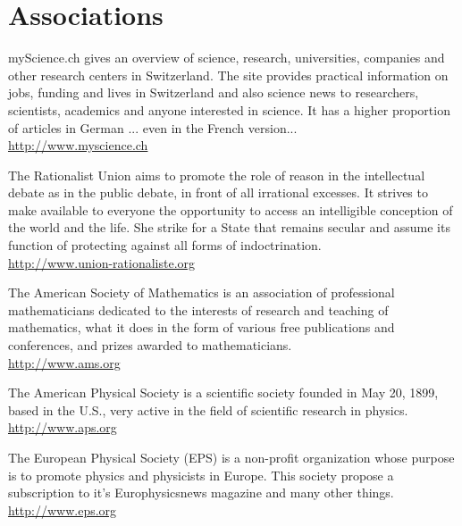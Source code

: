 	\section{Associations}

		{\Large {}} myScience.ch gives an overview of science, research, universities, companies and other research centers in Switzerland. The site provides practical information on jobs, funding and lives in Switzerland and also science news to researchers, scientists, academics and anyone interested in science. It has a higher proportion of articles in German ... even in the French version...\\
		\href{http://www.myscience.ch}{\color{blue}http://www.myscience.ch}
		
		{\Large {}}{\Large {}}{\Large {}}\bcdfrance{} The Rationalist Union aims to promote the role of reason in the intellectual debate as in the public debate, in front of all irrational excesses. It strives to make available to everyone the opportunity to access an intelligible conception of the world and the life. She strike for a State that remains secular and assume its function of protecting against all forms of indoctrination.\\
		\href{http://www.union-rationaliste.org}{\color{blue}http://www.union-rationaliste.org}
		
		{\Large {}}{\Large {}} The American Society of Mathematics is an association of professional mathematicians dedicated to the interests of research and teaching of mathematics, what it does in the form of various free publications and conferences, and prizes awarded to mathematicians.\\
		\href{http://www.ams.org}{\color{blue}http://www.ams.org}
		
		{\Large {}}{\Large {}} The American Physical Society is a scientific society founded in May 20, 1899, based in the U.S., very active in the field of scientific research in physics.\\
		\href{http://www.aps.org}{\color{blue}http://www.aps.org}
		
		{\Large {}}{\Large {}}{\Large {}} The European Physical Society (EPS) is a non-profit organization whose purpose is to promote physics and physicists in Europe. This society propose a subscription to it's Europhysicsnews magazine and many other things.\\
		\href{http://www.eps.org}{\color{blue}http://www.eps.org}

